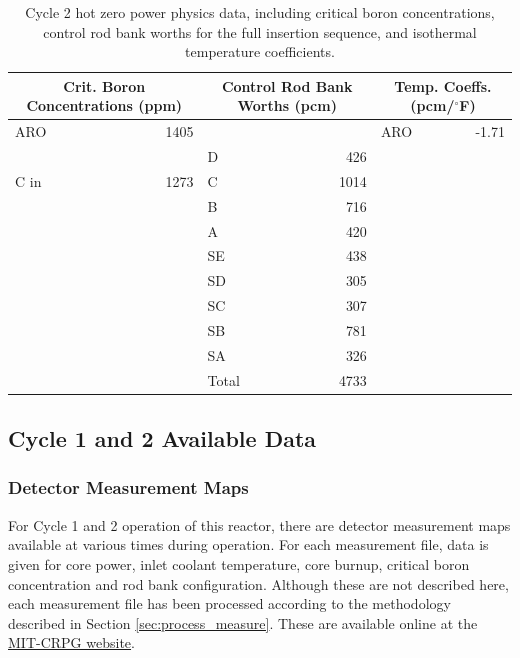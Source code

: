 \begin{table}[htp]
  \centering
  \caption[Cycle 2 hot zero power physics data.]{Cycle 2 hot zero power physics
  data, including critical boron concentrations, control rod bank worths for the
  full insertion sequence, and isothermal temperature coefficients.
  \label{tbl:meas_c2phys}}
  \begin{tabular}{l r l r l r}
    \toprule 
    \multicolumn{2}{c}{Crit. Boron Concentrations (\acs{ppm})} &
    \multicolumn{2}{c}{Control Rod Bank Worths (\acs{pcm})} &
    \multicolumn{2}{c}{Temp. Coeffs. (\acs{pcm}/$^\circ$F)}\\
    \midrule
    \midrule
	
    \ac{ARO} & 1405 &       &       & \ac{ARO} & -1.71 \\
             &      & D     & 426   &          &       \\
    C in     & 1273 & C     & 1014  &          &       \\
             &      & B     & 716   &          &       \\
             &      & A     & 420   &          &       \\
             &      & SE    & 438   &          &       \\
             &      & SD    & 305   &          &       \\
             &      & SC    & 307   &          &       \\
             &      & SB    & 781   &          &       \\
             &      & SA    & 326   &          &       \\
             &      & Total & 4733  &          &       \\
    
    \bottomrule
  \end{tabular}
\end{table}

\subsection{Cycle 1 and 2 Available Data}
\label{sec:available_data}

\subsubsection{Detector Measurement Maps}
\label{sec:measurement_maps}
For Cycle 1 and 2 operation of this reactor, there are detector measurement maps
available at various times during operation. For each measurement file, data is
given for core power, inlet coolant temperature, core burnup, critical boron
concentration and rod bank configuration.
Although these are not described here, each measurement file has been processed
according to the methodology described in Section \ref{sec:process_measure}.
These are available online at the
{\color{blue}\href{http://crpg.mit.edu/pub/beavrs}{MIT-CRPG website}}.

